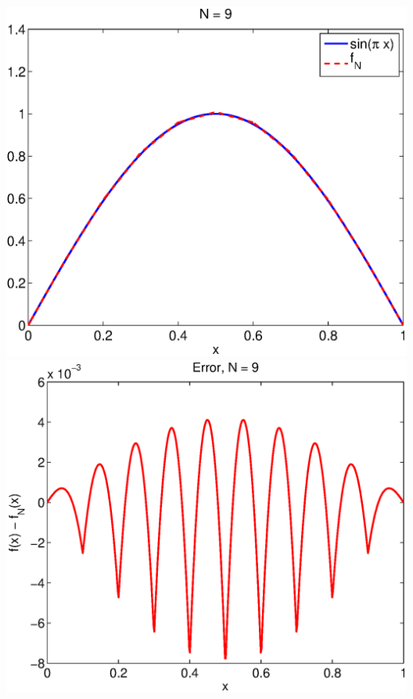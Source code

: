 \begin{solution}
\begin{enumerate}
\begin{center}
   \includegraphics[scale=0.4]{f_9a}\quad 
   \includegraphics[scale=0.4]{f_9b}
\end{center}


\end{enumerate}
\end{solution}
